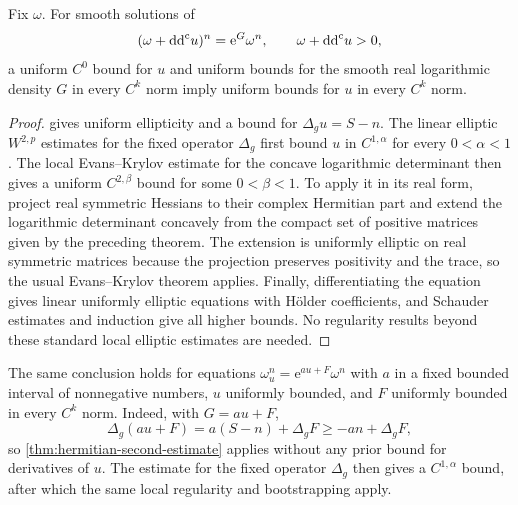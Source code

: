 

\begin{corollary}\label{cor:classical-higher-estimate}
Fix $\omega$. For smooth solutions of
\[
 (\omega+\mathrm{dd}^{\mathrm{c}} u)^n=\mathrm{e}^G\omega^n,\qquad\omega+\mathrm{dd}^{\mathrm{c}} u>0,
\]
a uniform $C^0$ bound for $u$ and uniform bounds for the smooth real logarithmic density $G$ in every $C^k$ norm imply uniform bounds for $u$ in every $C^k$ norm.
\end{corollary}
\begin{proof}
 gives uniform ellipticity and a bound for $\Delta_gu=S-n$. The linear elliptic $W^{2,p}$ estimates for the fixed operator $\Delta_g$ first bound $u$ in $C^{1,\alpha}$ for every $0<\alpha<1$. The local Evans--Krylov estimate for the concave logarithmic determinant then gives a uniform $C^{2,\beta}$ bound for some $0<\beta<1$. To apply it in its real form, project real symmetric Hessians to their complex Hermitian part and extend the logarithmic determinant concavely from the compact set of positive matrices given by the preceding theorem. The extension is uniformly elliptic on real symmetric matrices because the projection preserves positivity and the trace, so the usual Evans--Krylov theorem applies. Finally, differentiating the equation gives linear uniformly elliptic equations with H\"older coefficients, and Schauder estimates and induction give all higher bounds. No regularity results beyond these standard local elliptic estimates are needed.
\end{proof}

The same conclusion holds for equations $\omega_u^n=\mathrm{e}^{a u+F}\omega^n$ with $a$ in a fixed bounded interval of nonnegative numbers, $u$ uniformly bounded, and $F$ uniformly bounded in every $C^k$ norm. Indeed, with $G=au+F$,
\[
 \Delta_g(a u+F)=a(S-n)+\Delta_gF\geq-an+\Delta_gF,
\]
so \cref{thm:hermitian-second-estimate} applies without any prior bound for derivatives of $u$. The estimate for the fixed operator $\Delta_g$ then gives a $C^{1,\alpha}$ bound, after which the same local regularity and bootstrapping apply.
